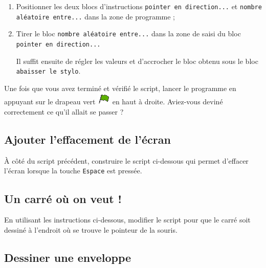 \begin{enumerate}
\item Positionner les deux blocs d'instructions \texttt{pointer en direction...} et \texttt{nombre aléatoire entre...} dans la zone de programme ;


\item Tirer le bloc \texttt{nombre aléatoire entre...} dans la zone de saisi du bloc \texttt{pointer en direction...}


Il suffit ensuite de régler les valeurs et d'accrocher le bloc obtenu sous le bloc \texttt{abaisser le stylo}.
\end{enumerate}



Une fois que vous avez terminé et vérifié le script, lancer le programme en appuyant sur le drapeau vert \includegraphics[width=.7cm]{./images/scratch/DrapeauVert} en haut à droite. Aviez-vous deviné correctement ce qu'il allait se passer ?




\subsection{Ajouter l'effacement de l'écran}

À côté du script précédent, construire le script ci-dessous qui permet d'effacer l'écran lorsque la touche \texttt{Espace} est pressée.







\subsection{Un carré où on veut !}

En utilisant les instructions ci-dessous, modifier le script pour que le carré soit dessiné à l'endroit où se trouve le pointeur de la souris.



\subsection{Dessiner une enveloppe}

